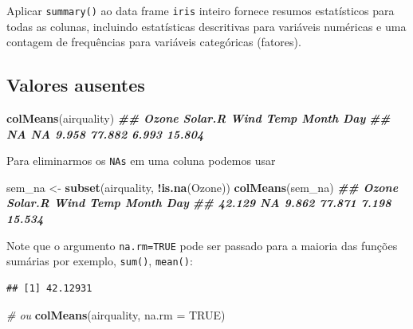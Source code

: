 \documentclass[
]{book}
\newenvironment{Shaded}{\begin{snugshade}}{\end{snugshade}}
\newcommand{\AttributeTok}[1]{\textcolor[rgb]{0.13,0.29,0.53}{#1}}
\newcommand{\CommentTok}[1]{\textcolor[rgb]{0.56,0.35,0.01}{\textit{#1}}}
\newcommand{\ConstantTok}[1]{\textcolor[rgb]{0.56,0.35,0.01}{#1}}
\newcommand{\DocumentationTok}[1]{\textcolor[rgb]{0.56,0.35,0.01}{\textbf{\textit{#1}}}}
\newcommand{\FunctionTok}[1]{\textcolor[rgb]{0.13,0.29,0.53}{\textbf{#1}}}
\newcommand{\NormalTok}[1]{#1}
\newcommand{\OtherTok}[1]{\textcolor[rgb]{0.56,0.35,0.01}{#1}}
\newcommand{\SpecialCharTok}[1]{\textcolor[rgb]{0.81,0.36,0.00}{\textbf{#1}}}
\begin{document}
Aplicar \texttt{summary()} ao data frame \texttt{iris} inteiro fornece resumos
estatísticos para todas as colunas, incluindo estatísticas descritivas
para variáveis numéricas e uma contagem de frequências para variáveis
categóricas (fatores).

\subsection{Valores ausentes}\label{valores-ausentes}

\begin{Shaded}
\begin{Highlighting}[]
\FunctionTok{colMeans}\NormalTok{(airquality)}
\DocumentationTok{\#\#   Ozone Solar.R    Wind    Temp   Month     Day }
\DocumentationTok{\#\#      NA      NA   9.958  77.882   6.993  15.804}
\end{Highlighting}
\end{Shaded}

Para eliminarmos os \texttt{NAs} em uma coluna podemos usar

\begin{Shaded}
\begin{Highlighting}[]
\NormalTok{sem\_na }\OtherTok{\textless{}{-}} \FunctionTok{subset}\NormalTok{(airquality, }\SpecialCharTok{!}\FunctionTok{is.na}\NormalTok{(Ozone))}
\FunctionTok{colMeans}\NormalTok{(sem\_na)}
\DocumentationTok{\#\#   Ozone Solar.R    Wind    Temp   Month     Day }
\DocumentationTok{\#\#  42.129      NA   9.862  77.871   7.198  15.534}
\end{Highlighting}
\end{Shaded}

Note que o argumento \texttt{na.rm=TRUE} pode ser passado para a maioria das
funções sumárias por exemplo, \texttt{sum()}, \texttt{mean()}:

\begin{Shaded}
\end{Shaded}

\begin{verbatim}
## [1] 42.12931
\end{verbatim}

\begin{Shaded}
\begin{Highlighting}[]
\CommentTok{\# ou}
\FunctionTok{colMeans}\NormalTok{(airquality, }\AttributeTok{na.rm =} \ConstantTok{TRUE}\NormalTok{)}
\end{Highlighting}
\end{Shaded}
\end{document}
